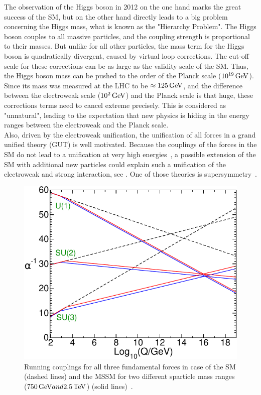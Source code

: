 The observation of the Higgs boson in 2012 on the one hand marks the great success of the SM, but on the other hand directly leads to a big problem concerning the Higgs mass, what is known as the "Hierarchy Problem". The Higgs boson couples to all massive particles, and the coupling strength is proportional to their masses. But unlike for all other particles, the mass term for the Higgs boson is quadratically divergent, caused by virtual loop corrections. The cut-off scale for these corrections can be as large as the validity scale of the SM. Thus, the Higgs boson mass can be pushed to the order of the Planck scale ($10^{19}\,\text{Ge\hspace{-.08em}V}$). Since its mass was measured at the LHC to be $\approx 125\,\text{Ge\hspace{-.08em}V}$, and the difference between the electroweak scale ($10^2\,\text{Ge\hspace{-.08em}V}$) and the Planck scale is that huge, these corrections terms need to cancel extreme precisely. This is considered as "unnatural", leading to the expectation that new physics is hiding in the energy ranges between the electroweak and the Planck scale.\\
Also, driven by the electroweak unification, the unification of all forces in a grand unified theory (GUT) is well motivated. Because the couplings of the forces in the SM do not lead to a unification at very high energies~\cite{PDG}, a possible extension of the SM with additional new particles could explain such a unification of the electroweak and strong interaction, see . One of those theories is supersymmetry~\cite{SUSYOriginal}.
\begin{figure}
 \centering
 \includegraphics[width=\pairwidth]{figures/general/couplings}
 \caption{Running couplings for all three fundamental forces in case of the SM (dashed lines) and the MSSM for two different sparticle mass ranges ($750\,\text{Ge\hspace{-.08em}V} and 2.5\,\text{Te\hspace{-.08em}V}$) (solid lines)~\cite{SUSYPrimer}.}
 \label{fig:couplings}
\end{figure}



